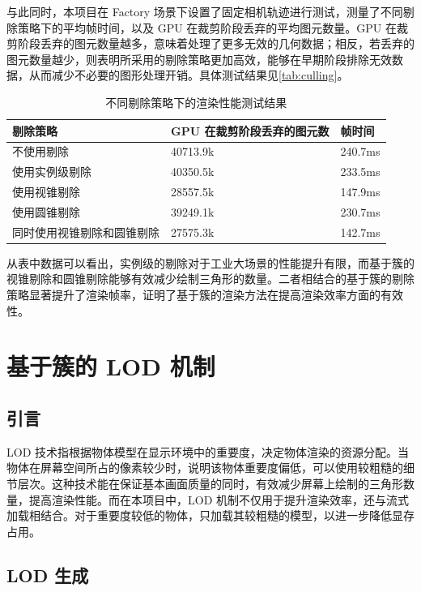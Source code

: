 与此同时，本项目在 Factory 场景下设置了固定相机轨迹进行测试，测量了不同剔除策略下的平均帧时间，以及 GPU 在裁剪阶段丢弃的平均图元数量。GPU 在裁剪阶段丢弃的图元数量越多，意味着处理了更多无效的几何数据；相反，若丢弃的图元数量越少，则表明所采用的剔除策略更加高效，能够在早期阶段排除无效数据，从而减少不必要的图形处理开销。具体测试结果见\autoref{tab:culling}。

\begin{table}[H]
    \caption{\label{tab:culling}不同剔除策略下的渲染性能测试结果}
    \centering
    \begin{tabularx}{\linewidth}{|X<{\centering}|X<{\centering}|X<{\centering}|}
        \hline
        剔除策略 & GPU 在裁剪阶段丢弃的图元数 & 帧时间 \\ \hline
        不使用剔除 & 40713.9k & 240.7ms \\ \hline
        使用实例级剔除 & 40350.5k & 233.5ms \\ \hline
        使用视锥剔除 & 28557.5k & 147.9ms \\ \hline
        使用圆锥剔除 & 39249.1k & 230.7ms \\ \hline
        同时使用视锥剔除和圆锥剔除 & 27575.3k & 142.7ms \\ \hline
    \end{tabularx}
\end{table}

从表中数据可以看出，实例级的剔除对于工业大场景的性能提升有限，而基于簇的视锥剔除和圆锥剔除能够有效减少绘制三角形的数量。二者相结合的基于簇的剔除策略显著提升了渲染帧率，证明了基于簇的渲染方法在提高渲染效率方面的有效性。

\clearpage

\section{基于簇的 LOD 机制}

\subsection{引言}

LOD 技术指根据物体模型在显示环境中的重要度，决定物体渲染的资源分配。当物体在屏幕空间所占的像素较少时，说明该物体重要度偏低，可以使用较粗糙的细节层次。这种技术能在保证基本画面质量的同时，有效减少屏幕上绘制的三角形数量，提高渲染性能\cite{Deng2017}。而在本项目中，LOD 机制不仅用于提升渲染效率，还与流式加载相结合。对于重要度较低的物体，只加载其较粗糙的模型，以进一步降低显存占用。

\subsection{LOD 生成} \label{subsec:LOD generation}

